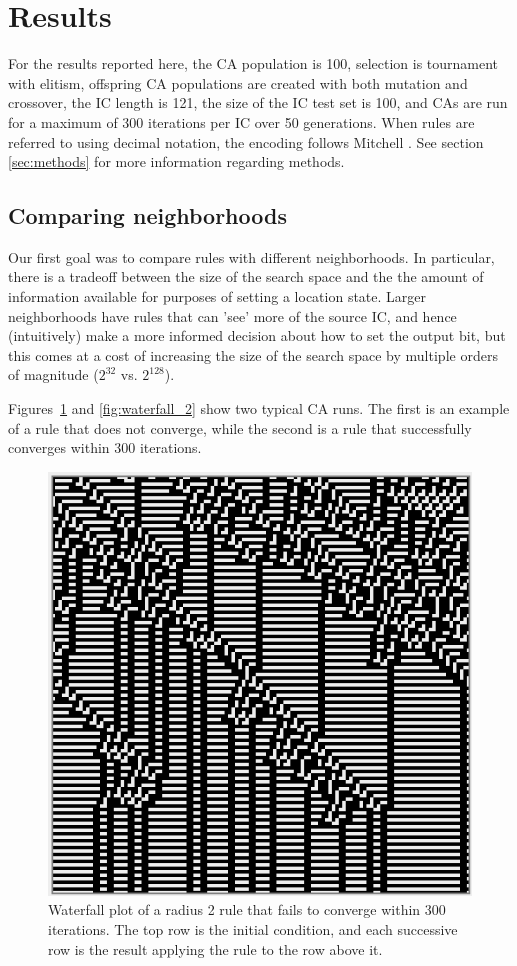 \section{Results} \label{results}

For the results reported here, the CA population is 100, selection is tournament with elitism, offspring CA populations are created with both 
mutation and crossover, the IC length is 121, the size of the IC test set is 100, and CAs are run for a maximum of 
300 iterations per IC over 50 generations. When rules are referred to using decimal notation, the encoding follows Mitchell 
\cite{Mitchell:1994:ECA:186092.186116}. See section \ref{sec:methods} 
for more information regarding methods.

\subsection{Comparing neighborhoods} \label{sec:2_1}
Our first goal was to compare rules with different neighborhoods. In particular, there is a tradeoff between the size of the search space and the 
the amount of information available for purposes of setting a location state. Larger neighborhoods have rules that can 'see' more of the source IC, and 
hence (intuitively) make a more informed decision about how to set the output bit, but this comes at a cost of increasing the size of the search space by multiple 
orders of magnitude ($2^{32}$ vs. $2^{128}$).

Figures~\ref{fig:waterfall_1} and \ref{fig:waterfall_2} show two typical CA runs. The first is an example of a rule that does not converge, while the second 
is a rule that successfully converges within 300 iterations.

\begin{figure}
\begin{center}
\includegraphics[width=0.8\linewidth]{figures/non_converging_radius2.png}
\caption{Waterfall plot of a radius 2 rule that fails to converge within 300 iterations. The top row is the initial condition, and each successive row is the 
result applying the rule to the row above it.}
\label{fig:waterfall_1}
\end{center}
\end{figure}


